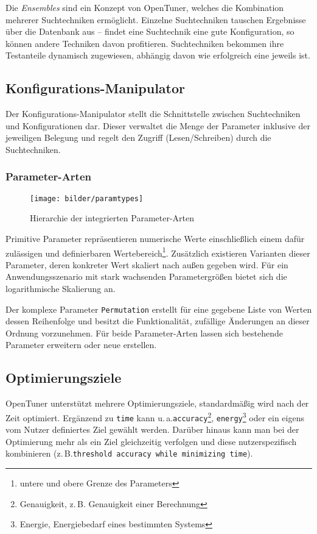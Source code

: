 \documentclass[a4paper,11pt]{scrartcl}
\newcommand{\zB}{\mbox{z.\,B.}\xspace}
\newcommand{\ua}{\mbox{u.\,a.}\xspace}
\begin{document}
Die \emph{Ensembles} sind ein Konzept von OpenTuner, welches die Kombination mehrerer Suchtechniken
ermöglicht. Einzelne Suchtechniken tauschen Ergebnisse über die Datenbank aus -- findet eine 
Suchtechnik eine gute Konfiguration, so können andere Techniken davon profitieren.
Suchtechniken bekommen ihre Testanteile dynamisch zugewiesen, abhängig davon wie erfolgreich eine
jeweils ist.

\subsection{Konfigurations-Manipulator}
Der Konfigurations-Manipulator stellt die Schnittstelle zwischen Suchtechniken und Konfigurationen
dar. Dieser verwaltet die Menge der Parameter inklusive der jeweiligen Belegung und regelt den Zugriff
(Lesen/Schreiben) durch die Suchtechniken.

\subsubsection{Parameter-Arten}

\begin{figure}[h]
\begin{center}
\texttt{[image: bilder/paramtypes]}
\cite[S.~5]{OT-paper} \caption{Hierarchie der integrierten Parameter-Arten} 
\end{center}
\end{figure}

Primitive Parameter repräsentieren numerische Werte einschließlich einem dafür
zulässigen und definierbaren Wertebereich\footnote{untere und obere Grenze des Parameters}. 
Zusätzlich existieren Varianten dieser Parameter,
deren konkreter Wert skaliert nach außen gegeben wird. Für ein Anwendungsszenario mit 
stark wachsenden Parametergrößen bietet sich die logarithmische Skalierung an. \newline

Der komplexe Parameter \texttt{Permutation} erstellt für eine gegebene Liste von Werten dessen 
Reihenfolge und besitzt die Funktionalität, zufällige Änderungen an dieser Ordnung vorzunehmen.
Für beide Parameter-Arten lassen sich bestehende Parameter erweitern oder neue erstellen.

\subsection{Optimierungsziele}

OpenTuner unterstützt mehrere Optimierungsziele, standardmäßig wird nach der Zeit optimiert.
Ergänzend zu \texttt{time} kann \ua \texttt{accuracy}\footnote{Genauigkeit, \zB Genauigkeit einer Berechnung}, 
\texttt{energy}\footnote{Energie, Energiebedarf eines bestimmten Systems} oder ein eigens vom 
Nutzer definiertes Ziel gewählt werden.
Darüber hinaus kann man bei der Optimierung mehr als ein Ziel gleichzeitig verfolgen und
diese nutzerspezifisch kombinieren (\zB \texttt{threshold accuracy  while
minimizing time}). 
\end{document}
